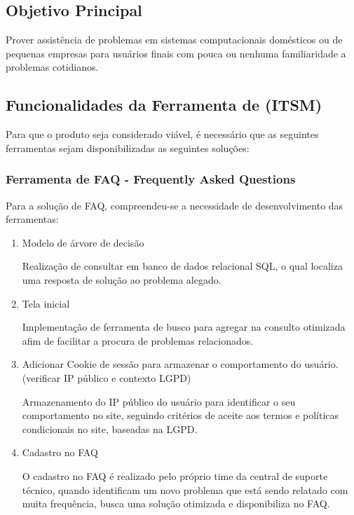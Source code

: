 \documentclass[
    12pt,               %
    openright,          %
    oneside,
    a4paper,            %
    MODELO,             %
    english,            %
    brazil              %
   ]{ifsp-spo-inf-ctds}
\begin{document}
\subsection{Objetivo Principal}

Prover assistência de problemas em sistemas computacionais domésticos ou de pequenas empresas para usuários finais com pouca ou nenhuma familiaridade a problemas cotidianos.

\subsection{Funcionalidades da Ferramenta de (ITSM)}

Para que o produto seja considerado viável, é necessário que as seguintes ferramentas sejam disponibilizadas as seguintes soluções: 

\subsubsection{Ferramenta de FAQ - Frequently Asked Questions}

Para a solução de FAQ, compreendeu-se a necessidade de desenvolvimento das ferramentas:

\begin{enumerate}
	\item Modelo de árvore de decisão
	
	Realização de consultar em banco de dados relacional SQL, o qual localiza uma resposta de solução ao problema alegado.
	
	\item Tela inicial
	
	Implementação de ferramenta de busco para agregar na consulto otimizada afim de facilitar a procura de problemas relacionados.
	
	\item Adicionar Cookie de sessão para armazenar o comportamento do usuário. (verificar IP público e contexto LGPD)
	
	Armazenamento do IP público do usuário para identificar o seu comportamento no site, seguindo critérios de aceite aos termos e políticas condicionais no site, baseadas na LGPD.
	
	\item Cadastro no FAQ
	
	O cadastro no FAQ é realizado pelo próprio time da central de suporte técnico, quando identificam um novo problema que está sendo relatado com muita frequência, busca uma solução otimizada e disponibiliza no FAQ. 
\end{enumerate}
\end{document}
